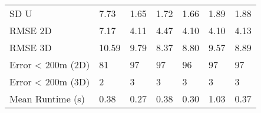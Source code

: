 \begin{longtable}{lllllll}
SD U              &       7.73 &       1.65 &      1.72 &     1.66 &     1.89 &        1.88 \\
RMSE 2D           &       7.17 &       4.11 &      4.47 &     4.10 &     4.10 &        4.13 \\
RMSE 3D           &      10.59 &       9.79 &      8.37 &     8.80 &     9.57 &        8.89 \\
Error < 200m (2D) &         81 &         97 &        97 &       96 &       97 &          97 \\
Error < 200m (3D) &          2 &          3 &         3 &        3 &        3 &           3 \\
Mean Runtime (s)  &       0.38 &       0.27 &      0.38 &     0.30 &     1.03 &        0.37 \\
\end{longtable}
